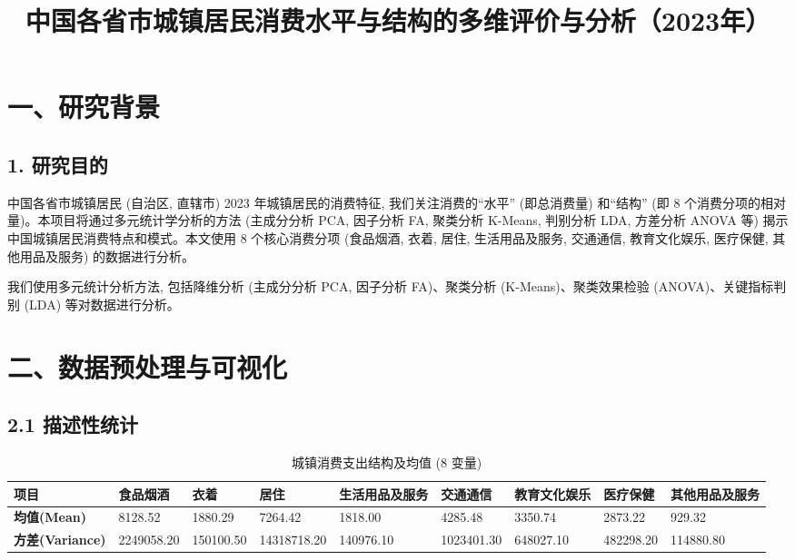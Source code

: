 \documentclass[12pt, a4paper]{article}
\begin{document}
\title{中国各省市城镇居民消费水平与结构的多维评价与分析（2023年）}
\author{} %
\date{} %

\maketitle

\section*{\centering 一、研究背景}
\subsection*{1. 研究目的}
\noindent 中国各省市城镇居民 (自治区, 直辖市) 2023 年城镇居民的消费特征, 我们关注消费的“水平” (即总消费量) 和“结构” (即 8 个消费分项的相对量)。本项目将通过多元统计学分析的方法 (主成分分析 PCA, 因子分析 FA, 聚类分析 K-Means, 判别分析 LDA, 方差分析 ANOVA 等) 揭示中国城镇居民消费特点和模式。本文使用 8 个核心消费分项 (食品烟酒, 衣着, 居住, 生活用品及服务, 交通通信, 教育文化娱乐, 医疗保健, 其他用品及服务) 的数据进行分析。

\noindent 我们使用多元统计分析方法, 包括降维分析 (主成分分析 PCA, 因子分析 FA)、聚类分析 (K-Means)、聚类效果检验 (ANOVA)、关键指标判别 (LDA) 等对数据进行分析。

\section*{\centering 二、数据预处理与可视化}
\subsection*{2.1 描述性统计}
\begin{table}[H]
    \centering
    \caption{城镇消费支出结构及均值 (8 变量)}
    \label{tab:desc_stats}
    \begin{tabularx}{\textwidth}{Y|*{8}{X}} %
        \toprule
        \textbf{项目} & \textbf{食品烟酒} & \textbf{衣着} & \textbf{居住} & \textbf{生活用品及服务} & \textbf{交通通信} & \textbf{教育文化娱乐} & \textbf{医疗保健} & \textbf{其他用品及服务} \\
        \midrule
        \textbf{均值(Mean)} & 8128.52 & 1880.29 & 7264.42 & 1818.00 & 4285.48 & 3350.74 & 2873.22 & 929.32 \\
        \textbf{方差(Variance)} & 2249058.20 & 150100.50 & 14318718.20 & 140976.10 & 1023401.30 & 648027.10 & 482298.20 & 114880.80 \\
        \bottomrule
    \end{tabularx}
\end{table}
\end{document}
